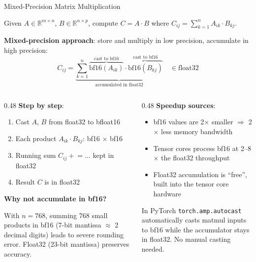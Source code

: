 \begin{frame}{Mixed-Precision Matrix Multiplication}

  Given $A \in \mathbb{R}^{m \times n}$, $B \in \mathbb{R}^{n \times p}$, compute $C = A \cdot B$ where $C_{ij} = \sum_{k=1}^{n} A_{ik} \cdot B_{kj}$.

  \vspace{0.3em}
  \textbf{Mixed-precision approach}: store and multiply in low precision, accumulate in high precision:
  \[
    C_{ij} = \underbrace{\sum_{k=1}^{n}
      \overbrace{\mathrm{bf16}(A_{ik})}^{\text{cast to bf16}} \cdot
      \overbrace{\mathrm{bf16}(B_{kj})}^{\text{cast to bf16}}
    }_{\text{accumulated in float32}}
    \quad \in \text{float32}
  \]

  \vspace{0.3em}
  \begin{columns}
    \begin{column}{0.48\textwidth}
      \textbf{Step by step}:
      \begin{enumerate}
        \item Cast $A$, $B$ from float32 to bfloat16
        \item Each product $A_{ik} \cdot B_{kj}$: bf16 $\times$ bf16
        \item Running sum $C_{ij} \mathrel{+}= \ldots$ kept in float32
        \item Result $C$ is in float32
      \end{enumerate}

      \vspace{0.3em}
      \textbf{Why not accumulate in bf16?}

      With $n = 768$, summing 768 small products in bf16 (7-bit mantissa $\approx$ 2 decimal digits) leads to severe rounding error. Float32 (23-bit mantissa) preserves accuracy.
    \end{column}
    \begin{column}{0.48\textwidth}
      \textbf{Speedup sources}:
      \begin{itemize}
        \item bf16 values are 2$\times$ smaller $\Rightarrow$ 2$\times$ less memory bandwidth
        \item Tensor cores process bf16 at 2--8$\times$ the float32 throughput
        \item Float32 accumulation is ``free'', built into the tensor core hardware
      \end{itemize}

      \vspace{0.3em}
      \begin{block}{In PyTorch}
        \texttt{torch.amp.autocast} automatically casts matmul inputs to bf16 while the accumulator stays in float32. No manual casting needed.
      \end{block}
    \end{column}
  \end{columns}

\end{frame}

